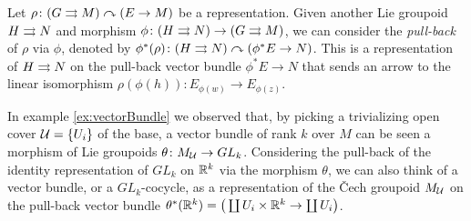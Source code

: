 Let $\rho\colon (G\rightrightarrows M)\curvearrowright (E\to M)$ be a representation.
Given another Lie groupoid $H\rightrightarrows N$ and morphism $\phi\colon (H\rightrightarrows N) \to (G\rightrightarrows M)$, we can consider the \emph{pull-back} of $\rho$ via $\phi$, denoted by \(\phi^*(\rho)\colon (H\rightrightarrows N)\curvearrowright (\phi^*E\to N)\).
This is a representation of $H\rightrightarrows N$ on the pull-back vector bundle $\phi^*E\to N$ that sends an arrow  to the linear isomorphism $\rho(\phi(h))\colon E_{\phi(w)}\to E_{\phi(z)}$.

\begin{example}
In example \ref{ex:vectorBundle} we observed that, by picking a trivializing open cover $\mathcal{U}=\{U_i\}$ of the base, a vector bundle of rank $k$ over $M$ can be seen a morphism of Lie groupoids $\theta\colon M_{\mathcal{U}} \to GL_k$.
Considering the pull-back of the identity representation of $GL_k$ on $\mathbb{R}^k$ via the morphism $\theta$, we can also think of a vector bundle, or a $GL_k$-cocycle, as a representation of the \v Cech groupoid $M_{\mathcal{U}}$ on the pull-back vector bundle $\theta^*(\mathbb{R}^k) = \big( \coprod U_i\times \mathbb{R}^k \to \coprod U_i \big)$.
\end{example}




